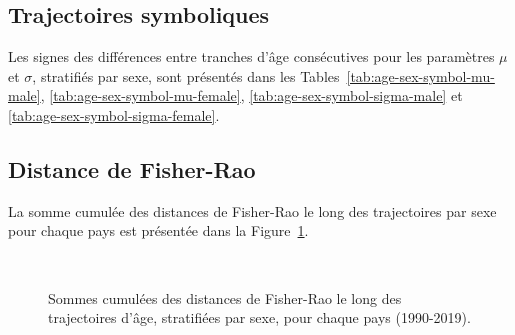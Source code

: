 \subsection{Trajectoires symboliques}
Les signes des différences entre tranches d'âge consécutives pour les paramètres $\mu$ et $\sigma$, stratifiés par sexe, sont présentés dans les Tables~\ref{tab:age-sex-symbol-mu-male}, \ref{tab:age-sex-symbol-mu-female}, \ref{tab:age-sex-symbol-sigma-male} et \ref{tab:age-sex-symbol-sigma-female}.

\begin{table}[H]
	\centering
	
	\label{tab:age-sex-symbol-mu-male}
\end{table}

\begin{table}[H]
	\centering
	
	\label{tab:age-sex-symbol-mu-female}
\end{table}

\begin{table}[H]
	\centering
	
	\label{tab:age-sex-symbol-sigma-male}
\end{table}

\begin{table}[H]
	\centering
	
	\label{tab:age-sex-symbol-sigma-female}
\end{table}

\subsection{Distance de Fisher-Rao}
La somme cumulée des distances de Fisher-Rao le long des trajectoires par sexe pour chaque pays est présentée dans la Figure~\ref{fig:age-sex_FR_cumulative}.
\begin{figure}[H]
	\centering
	\\
	\caption{Sommes cumulées des distances de Fisher-Rao le long des trajectoires d'âge, stratifiées par sexe, pour chaque pays (1990-2019).}
	\label{fig:age-sex_FR_cumulative}
\end{figure}

